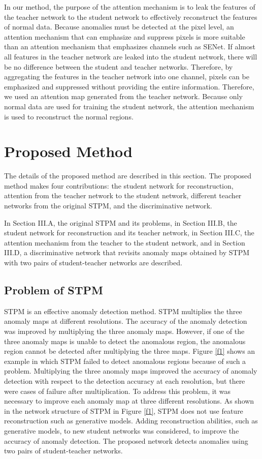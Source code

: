 \documentclass[letterpaper, 10 pt, conference]{ieeeconf}
\begin{document}
In our method, the purpose of the attention mechanism is to leak the features of the teacher network to the student network to effectively reconstruct the features of normal data. Because anomalies must be detected at the pixel level, an attention mechanism that can emphasize and suppress pixels is more suitable than an attention mechanism that emphasizes channels such as SENet. If almost all features in the teacher network are leaked into the student network, there will be no difference between the student and teacher networks. Therefore, by aggregating the features in the teacher network into one channel, pixels can be emphasized and suppressed without providing the entire information. Therefore, we used an attention map generated from the teacher network. Because only normal data are used for training the student network, the attention mechanism is used to reconstruct the normal regions.


\section{Proposed Method}

The details of the proposed method are described in this section. The proposed method makes four contributions: the student network for reconstruction, attention from the teacher network to the student network, different teacher networks from the original STPM, and the discriminative network.

In Section III.A, the original STPM and its problems, in Section III.B, the student network for reconstruction and its teacher network, in Section III.C, the attention mechanism from the teacher to the student network, and in Section III.D, a discriminative network that revisits anomaly maps obtained by STPM with two pairs of student-teacher networks are described.


\subsection{Problem of STPM}

STPM is an effective anomaly detection method. STPM multiplies the three anomaly maps at different resolutions. The accuracy of the anomaly detection was improved by multiplying the three anomaly maps. However, if one of the three anomaly maps is unable to detect the anomalous region, the anomalous region cannot be detected after multiplying the three maps. Figure \ref{f1} shows an example in which STPM failed to detect anomalous regions  because of such a problem. Multiplying the three anomaly maps improved the accuracy of anomaly detection with respect to the detection accuracy at each resolution, but there were cases of failure after multiplication. To address this problem, it was necessary to improve each anomaly map at three different resolutions. As shown in the network structure of STPM in Figure \ref{f1}, STPM does not use feature reconstruction such as generative models. Adding reconstruction abilities, such as generative models, to new student networks was considered, to improve the accuracy of anomaly detection. The proposed network detects anomalies using two pairs of student-teacher networks.
\end{document}
